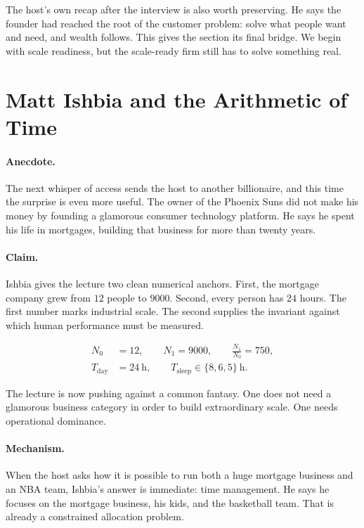 The host's own recap after the interview is also worth preserving. He says the founder had reached the root of the customer problem: solve what people want and need, and wealth follows. This gives the section its final bridge. We begin with scale readiness, but the scale-ready firm still has to solve something real.

\section{Matt Ishbia and the Arithmetic of Time}

\paragraph{Anecdote.} The next whisper of access sends the host to another billionaire, and this time the surprise is even more useful. The owner of the Phoenix Suns did not make his money by founding a glamorous consumer technology platform. He says he spent his life in mortgages, building that business for more than twenty years.

\paragraph{Claim.} Ishbia gives the lecture two clean numerical anchors. First, the mortgage company grew from \(12\) people to \(9000\). Second, every person has \(24\) hours. The first number marks industrial scale. The second supplies the invariant against which human performance must be measured.

\begin{align}
N_0 &= 12,\qquad N_1 = 9000,\qquad \frac{N_1}{N_0} = 750,\\
T_{\text{day}} &= 24\ \mathrm{h},\qquad T_{\text{sleep}} \in \{8,6,5\}\ \mathrm{h}.
\end{align}

The lecture is now pushing against a common fantasy. One does not need a glamorous business category in order to build extraordinary scale. One needs operational dominance.

\paragraph{Mechanism.} When the host asks how it is possible to run both a huge mortgage business and an NBA team, Ishbia's answer is immediate: time management. He says he focuses on the mortgage business, his kids, and the basketball team. That is already a constrained allocation problem.

